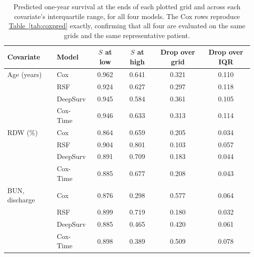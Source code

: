 \documentclass[11pt,a4paper]{article}
\newcommand{\tabref}[1]{\hyperref[#1]{Table~\ref*{#1}}}
\begin{document}
\begin{table}[H]
\centering
\caption{Predicted one-year survival at the ends of each plotted grid and
across each covariate's interquartile range, for all four models. The Cox rows reproduce
\tabref{tab:coxpred} exactly, confirming that all four are evaluated on the same grids and the same
representative patient.}
\label{tab:modelcurves}
\vspace{0.3em}
\footnotesize
\begin{tabular}{llcccc}
\toprule
Covariate & Model & $S$ at low & $S$ at high & Drop over grid & Drop over IQR \\
\midrule
Age (years) & Cox      & 0.962 & 0.641 & 0.321 & 0.110 \\
            & RSF      & 0.924 & 0.627 & 0.297 & 0.118 \\
            & DeepSurv & 0.945 & 0.584 & 0.361 & 0.105 \\
            & Cox-Time & 0.946 & 0.633 & 0.313 & 0.114 \\
\addlinespace
RDW (\%)    & Cox      & 0.864 & 0.659 & 0.205 & 0.034 \\
            & RSF      & 0.904 & 0.801 & 0.103 & 0.057 \\
            & DeepSurv & 0.891 & 0.709 & 0.183 & 0.044 \\
            & Cox-Time & 0.885 & 0.677 & 0.208 & 0.043 \\
\addlinespace
BUN, discharge & Cox      & 0.876 & 0.298 & 0.577 & 0.064 \\
               & RSF      & 0.899 & 0.719 & 0.180 & 0.032 \\
               & DeepSurv & 0.885 & 0.465 & 0.420 & 0.061 \\
               & Cox-Time & 0.898 & 0.389 & 0.509 & 0.078 \\
\bottomrule
\end{tabular}
\end{table}
\end{document}
